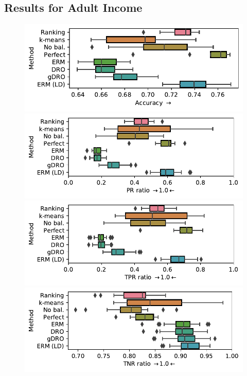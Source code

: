 \subsection{Results for Adult Income}\label{sec:adult-results}
\begin{figure}[p]
    \centering
    \includegraphics[width=\columnwidth]{figures/adult_partial_acc.pdf}
    \includegraphics[width=\columnwidth]{figures/adult_partial_prr.pdf}
    \includegraphics[width=\columnwidth]{figures/adult_partial_tprr.pdf}
    \includegraphics[width=\columnwidth]{figures/adult_partial_tnrr.pdf}

\end{figure}
